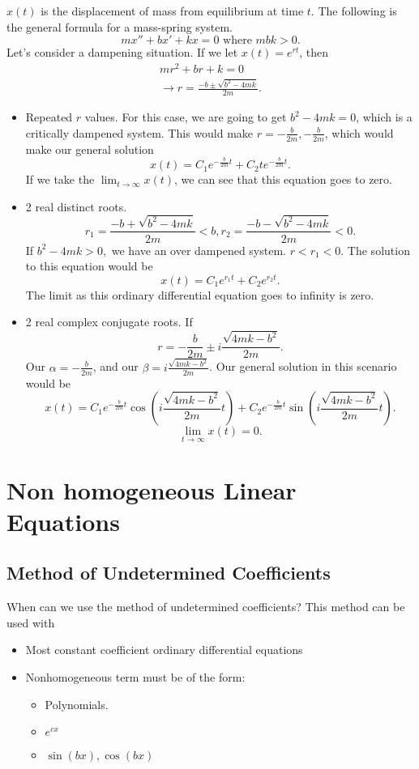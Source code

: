   $x(t)$ is the displacement of mass from equilibrium at time $t$. The following is the general formula for a mass-spring system.
  \[
    mx''+bx'+kx=0 \text{ where $mbk>0$}
  .\] 
  Let's consider a dampening situation. If we let $x(t)=e^{rt}$, then 
  \begin{align*}
  mr^2+br+k=0\\
  \to r=\frac{-b\pm\sqrt{b^2-4mk} }{2m}
  .\end{align*}
  \begin{itemize}
    \item Repeated $r$ values.
      For this case, we are going to get $b^2-4mk=0$, which is a critically dampened system. This would make $r=-\frac{b}{2m},-\frac{b}{2m}$, which would make our general solution 
      \[
        x(t)=C_1e^{-\frac{b}{2m}t}+C_2te^{-\frac{b}{2m}t}
      .\] 
      If we take the $\lim_{t \to \infty} x(t) $, we can see that this equation goes to zero.
    \item 2 real distinct roots.
      \[
        r_1=\frac{-b+\sqrt{b^2-4mk} }{2m}<b, r_2=\frac{-b-\sqrt{b^2-4mk} }{2m} <0 
      .\] 
      If $b^2-4mk > 0,$ we have an over dampened system. $r<r_1<0$. The solution to this equation would be 
      \[
        x(t)=C_1e^{r_1t}+C_2e^{r_2t}
      .\] 
      The limit as this ordinary differential equation goes to infinity is zero.
    \item 2 real complex conjugate roots. If 
      \[
      r=-\frac{b}{2m}\pm i \frac{\sqrt{4mk-b^2} }{2m}
      .\] 
      Our $\alpha = -\frac{b}{2m}$, and our $\beta=i \frac{\sqrt{4mk-b^2} }{2m}$. Our general solution in this scenario would be 
      \[
        x(t)=C_1e^{-\frac{b}{2m}t}\cos\left( i \frac{\sqrt{4mk-b^2} }{2m}t \right) +C_2e^{-\frac{b}{2m}t}\sin\left( i \frac{\sqrt{4mk-b^2} }{2m}t \right) 
      .\] 
      \[
        \lim_{t \to \infty} x(t)=0
      .\] 
  \end{itemize}
\section{Non homogeneous Linear Equations}

\subsection{Method of Undetermined Coefficients}

When can we use the method of undetermined coefficients? This method can be used with
\begin{itemize}
  \item Most constant coefficient ordinary differential equations
  \item Nonhomogeneous term must be of the form:
    \begin{itemize}
      \item Polynomials.
      \item $e^{cx}$
      \item $\sin(bx),\cos(bx)$
    \end{itemize}
\end{itemize}

